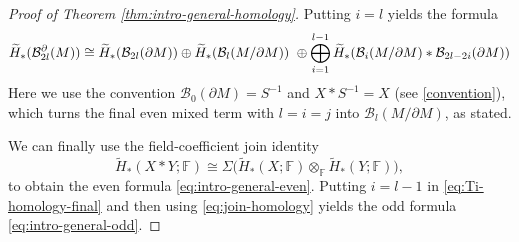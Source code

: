 \documentclass[10pt,a4paper]{amsart}
\newcommand{\BB}{\mathcal B}
\newcommand{\F}{\mathbb{F}}
\newcommand{\pa}{\partial}
\newcommand{\wt}{\widetilde}
\begin{document}
\begin{proof}[Proof of Theorem \ref{thm:intro-general-homology}]
Putting \(i=l\) yields the formula
$$\wt H_*(\BB_{2l}^{\pa}(M))
\cong
\wt H_*(\BB_{2l}(\pa M))
\oplus
\wt H_*(\BB_l(M/\pa M))
\notag\ \oplus
\bigoplus_{i=1}^{l-1}
\wt H_*(\BB_i(M/\pa M)*\BB_{2l-2i}(\pa M))
$$
Here we use the convention \(\BB_0(\pa M)=S^{-1}\) and $X*S^{-1} = X$ (see \eqref{convention}), which turns the final even mixed term with $l=i=j$ into \(\BB_l(M/\pa M)\), as stated. 

We can finally use the field-coefficient join identity
\begin{equation}\label{eq:join-homology}
\wt H_*(X*Y;\F)
\cong
\Sigma\bigl(\wt H_*(X;\F)\otimes_{\F}\wt H_*(Y;\F)\bigr),
\end{equation}
to obtain the even formula \eqref{eq:intro-general-even}.
Putting \(i=l-1\) in \eqref{eq:Ti-homology-final} and then using \eqref{eq:join-homology} yields the odd formula \eqref{eq:intro-general-odd}.  
\end{proof}
\end{document}
